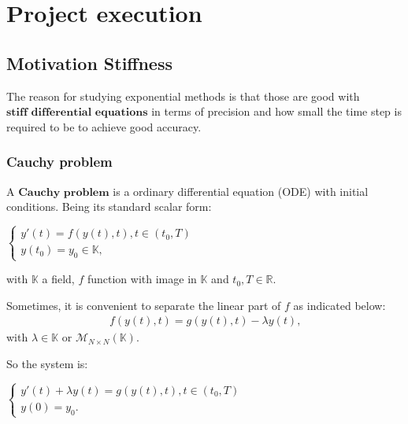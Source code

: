 \documentclass[letterpaper,10pt,english]{jupyterBook}
\begin{document}
\sphinxstepscope


\chapter{Project execution}
\label{\detokenize{Project_execution:project-execution}}\label{\detokenize{Project_execution::doc}}
\sphinxstepscope


\section{Motivation \sphinxhyphen{} Stiffness}
\label{\detokenize{cap1:motivation-stiffness}}\label{\detokenize{cap1::doc}}
\sphinxAtStartPar
The reason for studying exponential methods is that those are good with \(\textbf{stiff differential equations}\) in terms of precision and how small the time step is required to be to achieve good accuracy.


\subsection{Cauchy problem}
\label{\detokenize{cap1:cauchy-problem}}
\sphinxAtStartPar
A \(\textbf{Cauchy problem}\) is a ordinary differential equation (ODE) with initial conditions. Being its standard scalar form:

\sphinxAtStartPar
\(\begin{cases}
    y'(t) = f(y(t), t), t \in (t_0, T) \\
    y(t_0) = y_0 \in \mathbb{K} \text{,}
\end{cases}\)

\sphinxAtStartPar
with \(\mathbb{K}\) a field, \(f\) function with image in \(\mathbb{K}\) and \(t_0, T \in \mathbb{R}\).

\sphinxAtStartPar
Sometimes, it is convenient to separate the linear part of \(f\) as indicated below:
\begin{equation*}
\begin{split}
    f(y(t), t) = g(y(t), t) - \lambda y(t) \text{,}
\end{split}
\end{equation*}
\sphinxAtStartPar
with \(\lambda \in \mathbb{K}\) or \(\mathscr{M}_{N \times N}(\mathbb{K})\).

\sphinxAtStartPar
So the system is:

\sphinxAtStartPar
\(\begin{cases}
    y'(t) + \lambda y(t) = g(y(t), t), t \in (t_0, T) \\
    y(0) = y_0 
    \text{.}
\end{cases}\)
\end{document}
